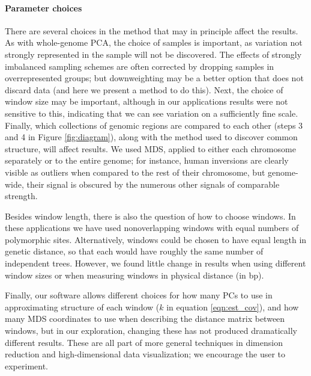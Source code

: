 \documentclass[11pt, oneside]{article}   	%
\begin{document}
\paragraph{Parameter choices}
There are several choices in the method that may in principle affect the results.
As with whole-genome PCA,
the choice of samples is important,
as variation not strongly represented in the sample will not be discovered.
The effects of strongly imbalanced sampling schemes are often corrected by dropping samples in overrepresented groups;
but downweighting may be a better option that does not discard data
(and here we present a method to do this).
Next, the choice of window size may be important,
although in our applications results were not sensitive to this,
indicating that we can see variation on a sufficiently fine scale.
Finally, which collections of genomic regions are compared to each other (steps 3 and 4 in Figure \ref{fig:diagram}),
along with the method used to discover common structure,
will affect results.
We used MDS, applied to either each chromosome separately or to the entire genome;
for instance, human inversions are clearly visible as outliers when compared to the rest of their chromosome,
but genome-wide, their signal is obscured by the numerous other signals of comparable strength.

Besides window length, there is also the question of how to choose windows.
In these applications we have used nonoverlapping windows with equal numbers of polymorphic sites.
Alternatively, windows could be chosen to have equal length in genetic distance,
so that each would have roughly the same number of independent trees.
However, we found little change in results when using different window sizes
or when measuring windows in physical distance (in bp).


Finally, our software allows different choices for how many PCs to use in approximating structure of each window ($k$ in equation \ref{eqn:est_cov}),
and how many MDS coordinates to use when describing the distance matrix between windows,
but in our exploration, changing these has not produced dramatically different results.
These are all part of more general techniques in dimension reduction and high-dimensional data visualization;
we encourage the user to experiment.
\end{document}
